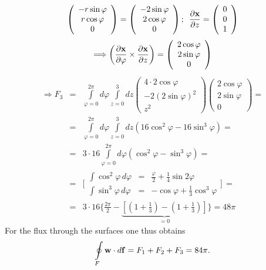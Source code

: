 {\begin{enumerate}
$$  \left(
    \begin{array}{c}
      -r \sin \varphi \\
       r \cos \varphi \\
       0
    \end{array}
  \right)=
  \left(
    \begin{array}{c}
      -2 \sin \varphi \\
       2 \cos \varphi \\
       0
    \end{array}
  \right); \enspace
  \frac{\partial {\bf x}}{\partial z} =
  \left(
    \begin{array}{c}
      0 \\
      0 \\
      1
    \end{array}
  \right)
$$
$$
   \Longrightarrow
  \left(
    \frac{\partial {\bf x}}{\partial \varphi} \times
    \frac{\partial {\bf x}}{\partial z}
  \right) =
  \left(
    \begin{array}{c}
      2 \cos \varphi \\
      2 \sin \varphi \\
      0
    \end{array}
  \right)
$$
\begin{eqnarray*}
  \Longrightarrow
  F_3 & = & \int \limits_{\varphi =0}^{2 \pi} \!\! d\varphi
    \int \limits_{z=0}^3 \!\! dz
    \left(
      \begin{array}{c}
        4 \cdot 2 \cos \varphi \\
        -2(2 \sin \varphi)^2 \\
        z^2
      \end{array}
    \right)
    \left(
      \begin{array}{c}
        2 \cos \varphi \\
        2 \sin \varphi \\
        0
      \end{array}
    \right)= \\
    &= & \int \limits_{\varphi =0}^{2 \pi} \!\! d\varphi
    \int \limits_{z=0}^3 \!\! dz
    \left(16 \cos^2 \varphi -16 \sin^3 \varphi\right) = \\
  & = & 3 \cdot 16 \int \limits_{\varphi =0}^{2 \pi} \!\! d\varphi
    \left( \cos^2\varphi - \sin^3 \varphi \right) = \\
  & = &
    \Biggl[
      \begin{array}{rcl}
        \int \cos^2 \varphi \, d\varphi & = & \frac{\varphi}{2}+
          \frac{1}{4} \sin 2 \varphi \\
        \int \sin^3 \varphi \, d\varphi & = & -\cos \varphi+
          \frac{1}{3} \cos^3 \varphi
      \end{array}
    \Biggr] \, = \\
    & = & 3 \cdot 16
    \Biggl\{
      \frac{2 \pi}{2}-
      \underbrace
        {\left[
          \left(1+\frac{1}{3}\right)-\left(1+\frac{1}{3}\right)
        \right]}
      _{=0}
    \Biggr\}=48 \pi
\end{eqnarray*}
For the flux through the surfaces one thus obtains
$$ \oint \limits_F {\bf w} \cdot d{\bf f}=F_1+F_2+F_3=84 \pi .$$






\end{enumerate}}
